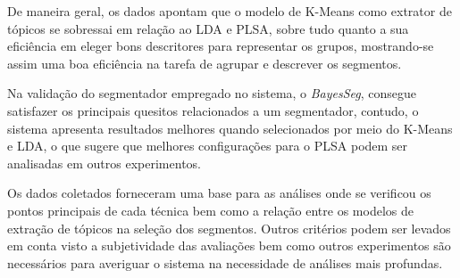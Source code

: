 

De maneira geral, os dados apontam que o modelo de K-Means como extrator de tópicos se sobressai em relação ao LDA e PLSA, sobre tudo quanto a sua eficiência em eleger bons descritores para representar os grupos, mostrando-se assim uma boa eficiência na tarefa de agrupar e descrever os segmentos.

Na validação do segmentador empregado no sistema, o \textit{BayesSeg}, consegue satisfazer os principais quesitos relacionados a um segmentador, contudo, o sistema apresenta resultados melhores quando selecionados por meio do K-Means e LDA, o que sugere que melhores configurações para o PLSA podem ser analisadas em outros experimentos.


Os dados coletados forneceram uma base para as análises onde se verificou os pontos principais de cada técnica bem como a relação entre os modelos de extração de tópicos na seleção dos segmentos. Outros critérios podem ser levados em conta visto a subjetividade das avaliações bem como outros experimentos são necessários para averiguar o sistema na necessidade de análises mais profundas.

